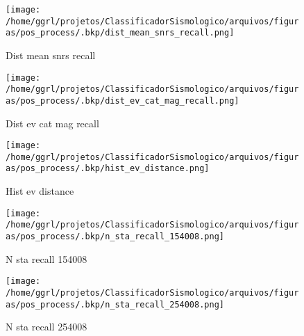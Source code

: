                     \begin{figure}[H]
                        \centering
                        \texttt{[image: /home/ggrl/projetos/ClassificadorSismologico/arquivos/figuras/pos\_process/.bkp/dist\_mean\_snrs\_recall.png]}
                        \caption{Dist mean snrs recall}
                        \label{fig:dist_mean_snrs_recall}
                    \end{figure}
                

                    \begin{figure}[H]
                        \centering
                        \texttt{[image: /home/ggrl/projetos/ClassificadorSismologico/arquivos/figuras/pos\_process/.bkp/dist\_ev\_cat\_mag\_recall.png]}
                        \caption{Dist ev cat mag recall}
                        \label{fig:dist_ev_cat_mag_recall}
                    \end{figure}
                

                    \begin{figure}[H]
                        \centering
                        \texttt{[image: /home/ggrl/projetos/ClassificadorSismologico/arquivos/figuras/pos\_process/.bkp/hist\_ev\_distance.png]}
                        \caption{Hist ev distance}
                        \label{fig:hist_ev_distance}
                    \end{figure}
                

                    \begin{figure}[H]
                        \centering
                        \texttt{[image: /home/ggrl/projetos/ClassificadorSismologico/arquivos/figuras/pos\_process/.bkp/n\_sta\_recall\_154008.png]}
                        \caption{N sta recall 154008}
                        \label{fig:n_sta_recall_154008}
                    \end{figure}
                

                    \begin{figure}[H]
                        \centering
                        \texttt{[image: /home/ggrl/projetos/ClassificadorSismologico/arquivos/figuras/pos\_process/.bkp/n\_sta\_recall\_254008.png]}
                        \caption{N sta recall 254008}
                        \label{fig:n_sta_recall_254008}
                    \end{figure}
                

